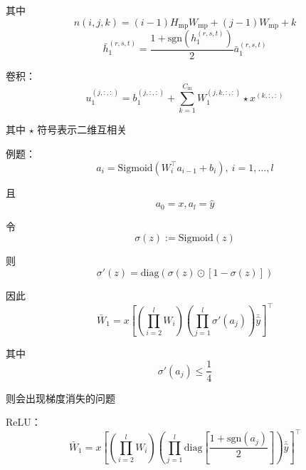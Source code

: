 \documentclass[openany]{ctexbook}
\theoremstyle{kaiti}
\theoremstyle{normal}
\begin{document}
其中 
\begin{equation}
  n\left(i,j,k \right)=\left(i-1 \right)H_{\mathrm{mp}}W_{\mathrm{mp}}+\left(j-1 \right)W_{\mathrm{mp}}+k
\end{equation}
\begin{equation}
  \bar{h}_{1}^{(r,s,t)}=\frac{1+\mathrm{sgn} \left(h_{1}^{(r,s,t)} \right)}{2} \bar{a}_{1}^{(r,s,t)}
\end{equation}

卷积：
\begin{equation}
  u_{1}^{\left(j,:,: \right)}=b_{1}^{\left(j,:,: \right)}+\sum_{k=1}^{C_{\mathrm{in}}}W_{1}^{\left(j,k,:,: \right)}\star x^{\left(k,:,: \right)}
\end{equation}

其中 $\star$ 符号表示二维互相关

例题：
\begin{equation}
  a_i=\mathrm{Sigmoid}\left(W_{i}^{\top}a_{i-1}+b_i \right),~i=1,\dots ,l
\end{equation}

且
\begin{equation}
  a_0=x, a_l=\hat{y}
\end{equation}

令
\begin{equation}
\sigma \left(z \right):=\mathrm{Sigmoid}\left(z \right)
\end{equation}

则
\begin{equation}
\sigma '\left(z \right)=\mathrm{diag}\left(\sigma \left(z \right)\odot \left[1-\sigma \left(z \right)\right] \right)
\end{equation}

因此
\begin{equation}
\bar{W}_1=x\left[\left(\prod_{i=2}^{l}W_i \right)\left(\prod_{j=1}^{l}\sigma '\left(a_j \right)\right)\bar{\hat{y}} \right] ^{\top}
\end{equation}

其中
\begin{equation}
\sigma '\left(a_j \right)\leqslant \frac{1}{4}
\end{equation}

则会出现梯度消失的问题

ReLU：
\begin{equation}
\bar{W}_1=x\left[\left(\prod_{i=2}^{l}W_i \right)\left(\prod_{j=1}^{l}\mathrm{diag}\left[\frac{1+\mathrm{sgn} \left(a_j \right)}{2}\right] \right)\bar{\hat{y}} \right] ^{\top}
\end{equation}
\end{document}
